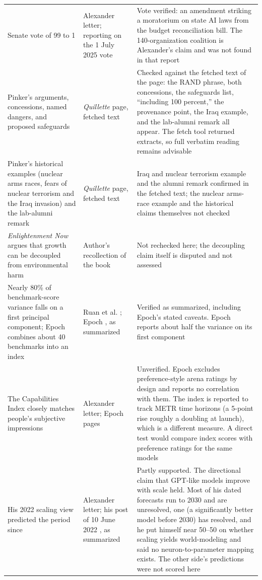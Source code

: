 \documentclass[11pt]{article}
\begin{document}
\begin{center}
\begin{tabular}{@{}p{}p{}p{}@{}}
Senate vote of 99 to 1 & Alexander letter; reporting on the 1 July 2025 vote \cite{senate2025} & Vote verified: an amendment striking a moratorium on state AI laws from the budget reconciliation bill. The 140-organization coalition is Alexander's claim and was not found in that report\\[0.4em]
Pinker's arguments, concessions, named dangers, and proposed safeguards & \emph{Quillette} page, fetched text & Checked against the fetched text of the page: the RAND phrase, both concessions, the safeguards list, ``including 100 percent,'' the provenance point, the Iraq example, and the lab-alumni remark all appear. The fetch tool returned extracts, so full verbatim reading remains advisable\\[0.4em]
Pinker's historical examples (nuclear arms races, fears of nuclear terrorism and the Iraq invasion) and the lab-alumni remark & \emph{Quillette} page, fetched text & Iraq and nuclear terrorism example and the alumni remark confirmed in the fetched text; the nuclear arms-race example and the historical claims themselves not checked\\[0.4em]
\emph{Enlightenment Now} argues that growth can be decoupled from environmental harm & Author's recollection of the book & Not rechecked here; the decoupling claim itself is disputed and not assessed\\[0.4em]
Nearly 80\% of benchmark-score variance falls on a first principal component; Epoch combines about 40 benchmarks into an index & Ruan et al. \cite{ruan2024}; Epoch \cite{epoch2025}, as summarized & Verified as summarized, including Epoch's stated caveats. Epoch reports about half the variance on its first component \cite{epochfactor2025}\\[0.4em]
The Capabilities Index closely matches people's subjective impressions & Alexander letter; Epoch pages & Unverified. Epoch excludes preference-style arena ratings by design and reports no correlation with them. The index is reported to track METR time horizons (a 5-point rise roughly a doubling at launch), which is a different measure. A direct test would compare index scores with preference ratings for the same models\\[0.4em]
His 2022 scaling view predicted the period since & Alexander letter; his post of 10 June 2022 \cite{alexander2022}, as summarized & Partly supported. The directional claim that GPT-like models improve with scale held. Most of his dated forecasts run to 2030 and are unresolved, one (a significantly better model before 2030) has resolved, and he put himself near 50--50 on whether scaling yields world-modeling and said no neuron-to-parameter mapping exists. The other side's predictions were not scored here\\[0.4em]

\end{tabular}
\end{center}
\end{document}
